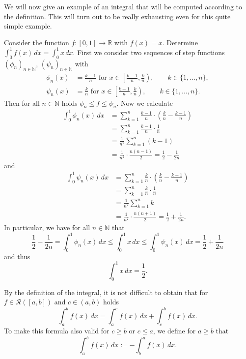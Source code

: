 

We will now give an example of an integral that will be computed according to the definition. This will turn out to be really exhausting even for this quite simple example.

\begin{example}
Consider the function $f:[0,1]\to\mathbb{R}$ with $f(x)=x$. Determine $\int_0^1f(x)\, dx=\int_0^1x\, dx$.
First we consider two sequences of step functions $(\phi_n)_{n\in\mathbb{N}}$, $(\psi_n)_{n\in\mathbb{N}}$
with
\[
\begin{aligned}
\phi_n(x)&=\frac{k-1}n\text{ for }x\in\left[\frac{k-1}n,\frac{k}n\right),\qquad k\in\{1,\ldots,n\},\\
\psi_n(x)&=\frac{k}n\text{ for }x\in\left[\frac{k-1}n,\frac{k}n\right),\qquad k\in\{1,\ldots,n\}.
\end{aligned}
\]
Then for all $n\in\mathbb{N}$ holds $\phi_n\leq f\leq \psi_n$. Now we calculate
\[
\begin{aligned}
\int_0^1\phi_n(x)\, dx&=\sum_{k=1}^n\frac{k-1}n\cdot\left(\frac{k}n-\frac{k-1}n\right)\\
&=
\sum_{k=1}^n\frac{k-1}{n}\cdot\frac{1}n\\&=\frac{1}{n^2}\sum_{k=1}^n(k-1)\\&=\frac{1}{n^2}\cdot\frac{n(n-1)}2=\frac12-\frac{1}{2n}
\end{aligned}
\]
and
\[\begin{aligned}
\int_0^1\psi_n(x)\, dx&=\sum_{k=1}^n\frac{k}n\cdot\left(\frac{k}n-\frac{k-1}n\right)\\&=
\sum_{k=1}^n\frac{k}{n}\cdot\frac{1}n\\&=\frac{1}{n^2}\sum_{k=1}^nk\\&=\frac{1}{n^2}\cdot\frac{n(n+1)}2=\frac12+\frac{1}{2n}.
\end{aligned}
\]
In particular, we have for all $n\in\mathbb{N}$ that
\[\frac12-\frac{1}{2n}=\int_0^1\phi_n(x)\, dx\leq\int_0^1x\, dx\leq \int_0^1\psi_n(x)\, dx=\frac12+\frac{1}{2n}\]
and thus
\[\int_0^1x\, dx=\frac12.\]
\end{example}

By the definition of the integral, it is not difficult to obtain that for $f\in\mathcal{R}([a,b])$ and $c\in(a,b)$ holds
\[\int_a^bf(x)\, dx=\int_a^cf(x)\, dx+\int_c^bf(x)\, dx.\]
To make this formula also valid for $c\geq b$ or $c\leq a$, we define for $a\geq b$ that
\[\int_a^bf(x)\, dx:=-\int_b^af(x)\, dx.\]

